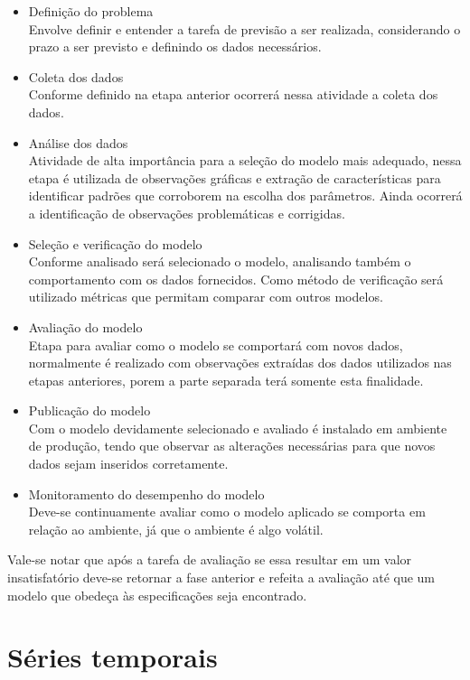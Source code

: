 \documentclass[
	12pt,
	oneside,
	a4paper,
	english,
	brazil
]{abntex2}
\begin{document}
\begin{itemize}
	\item Definição do problema\\
		Envolve definir e entender a tarefa de previsão a ser realizada,
        considerando o prazo a ser previsto e definindo os dados necessários.
	\item Coleta dos dados\\
		Conforme definido na etapa anterior ocorrerá nessa atividade a coleta
		dos dados.
	\item Análise dos dados\\
		Atividade de alta importância para a seleção do modelo mais adequado,
        nessa etapa é utilizada de observações gráficas e extração de 
        características para identificar padrões que corroborem na escolha dos 
        parâmetros. Ainda ocorrerá a identificação de observações problemáticas 
        e corrigidas.
	\item Seleção e verificação do modelo\\
        Conforme analisado será selecionado o modelo, analisando também o 
        comportamento com os dados fornecidos. Como método de verificação será 
        utilizado métricas que permitam comparar com outros modelos.
	\item Avaliação do modelo\\
        Etapa para avaliar como o modelo se comportará com novos dados, 
        normalmente é realizado com observações extraídas dos dados utilizados 
        nas etapas anteriores, porem a parte separada terá somente esta 
        finalidade.
	\item Publicação do modelo\\
        Com o modelo devidamente selecionado e avaliado é instalado em ambiente 
        de produção, tendo que observar as alterações necessárias para que novos 
        dados sejam inseridos corretamente.
    \item Monitoramento do desempenho do modelo\\
        Deve-se continuamente avaliar como o modelo aplicado se comporta em 
        relação ao ambiente, já que o ambiente é algo volátil.
\end{itemize}

Vale-se notar que após a tarefa de avaliação se essa resultar em um valor 
insatisfatório deve-se retornar a fase anterior e refeita a avaliação até que um 
modelo que obedeça às especificações seja encontrado.

\section{Séries temporais}
\end{document}
